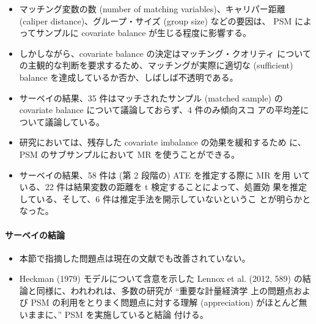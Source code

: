 \begin{itemize}
 \item マッチング変数の数 (number of matching variables)、キャリパー距離
       (caliper distance)、グループ・サイズ (group size) などの要因は、
       PSM によってサンプルに covariate balance が生じる程度に影響する。
 \item しかしながら、covariate balance の決定はマッチング・クオリティ
       についての主観的な判断を要求するため、マッチングが実際に適切な
       (sufficient) balance を達成しているか否か、しばしば不透明である。
 \item サーベイの結果、35 件はマッチされたサンプル (matched sample) の
       covariate balance について議論しておらず、4 件のみ傾向スコ
       アの平均差について議論している。
 \item 研究においては、残存した covariate imbalance の効果を緩和するため
       に、PSM のサブサンプルにおいて MR を使うことができる。
 \item サーベイの結果、58 件は (第 2 段階の) ATE を推定する際に MR を用
       いている、22 件は結果変数の距離を t 検定することによって、処置効
       果を推定している、そして、6 件は推定手法を開示していないというこ
       とが明らかとなった。
\end{itemize}

\paragraph{サーベイの結論}

\begin{itemize}
 \item 本節で指摘した問題点は現在の文献でも改善されていない。
 \item Heckman (1979) モデルについて含意を示した Lennox et al. (2012,
       589) の結論と同様に、われわれは、多数の研究が ``重要な計量経済学
       上の問題点および PSM の利用をとりまく問題点に対する理解
       (appreciation) がほとんど無いままに、'' PSM を実施していると結論
       付ける。 
\end{itemize}
